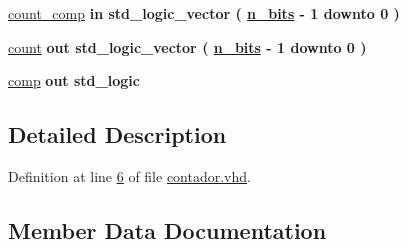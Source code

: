 \begin{DoxyCompactItemize}
\item 
\hyperlink{classcontador_a96447988f0843d79283d122598f5d510}{count\+\_\+comp}  {\bfseries {\bfseries \textcolor{keywordflow}{in}\textcolor{vhdlchar}{ }}} {\bfseries \textcolor{comment}{std\+\_\+logic\+\_\+vector}\textcolor{vhdlchar}{ }\textcolor{vhdlchar}{(}\textcolor{vhdlchar}{ }\textcolor{vhdlchar}{ }\textcolor{vhdlchar}{ }\textcolor{vhdlchar}{ }{\bfseries \hyperlink{classcontador_a986eb173f34190032418b47b9fc9b457}{n\+\_\+bits}} \textcolor{vhdlchar}{-\/}\textcolor{vhdlchar}{ } \textcolor{vhdldigit}{1} \textcolor{vhdlchar}{ }\textcolor{keywordflow}{downto}\textcolor{vhdlchar}{ }\textcolor{vhdlchar}{ } \textcolor{vhdldigit}{0} \textcolor{vhdlchar}{ }\textcolor{vhdlchar}{)}\textcolor{vhdlchar}{ }} 
\item 
\hyperlink{classcontador_a4566909c8f114af9a0e58632500cd4e9}{count}  {\bfseries {\bfseries \textcolor{keywordflow}{out}\textcolor{vhdlchar}{ }}} {\bfseries \textcolor{comment}{std\+\_\+logic\+\_\+vector}\textcolor{vhdlchar}{ }\textcolor{vhdlchar}{(}\textcolor{vhdlchar}{ }\textcolor{vhdlchar}{ }\textcolor{vhdlchar}{ }\textcolor{vhdlchar}{ }{\bfseries \hyperlink{classcontador_a986eb173f34190032418b47b9fc9b457}{n\+\_\+bits}} \textcolor{vhdlchar}{-\/}\textcolor{vhdlchar}{ } \textcolor{vhdldigit}{1} \textcolor{vhdlchar}{ }\textcolor{keywordflow}{downto}\textcolor{vhdlchar}{ }\textcolor{vhdlchar}{ } \textcolor{vhdldigit}{0} \textcolor{vhdlchar}{ }\textcolor{vhdlchar}{)}\textcolor{vhdlchar}{ }} 
\item 
\hyperlink{classcontador_a6fde1dafa392e429c8be2ce998a99f97}{comp}  {\bfseries {\bfseries \textcolor{keywordflow}{out}\textcolor{vhdlchar}{ }}} {\bfseries \textcolor{comment}{std\+\_\+logic}\textcolor{vhdlchar}{ }} 
\end{DoxyCompactItemize}


\subsection{Detailed Description}


Definition at line \hyperlink{contador_8vhd_source_l00006}{6} of file \hyperlink{contador_8vhd_source}{contador.\+vhd}.



\subsection{Member Data Documentation}
\hypertarget{classcontador_a4a4609c199d30b3adebbeb3a01276ec5}{}
